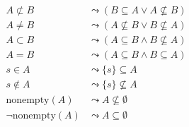 \documentclass{article}
\begin{document}
\begin{figure}[htbp]
\begin{center}
\begin{align*}
A \not\subset B &\leadsto (B \subseteq A \lor A \not\subseteq B) \\
A \not= B       &\leadsto (A \not\subseteq B \lor B \not\subseteq A) \\
A \subset B     &\leadsto (A \subseteq B \land B \not\subseteq A) \\
A = B           &\leadsto (A \subseteq B \land B \subseteq A) \\
s \in A         &\leadsto \{ s \} \subseteq A \\
s \not\in A     &\leadsto \{ s \} \not\subseteq A \\
\text{nonempty}(A)          &\leadsto A \not\subseteq \emptyset \\
\lnot \text{nonempty}(A)    &\leadsto A \subseteq \emptyset \\

\end{align*}
\end{center}
\end{figure}
\end{document}
